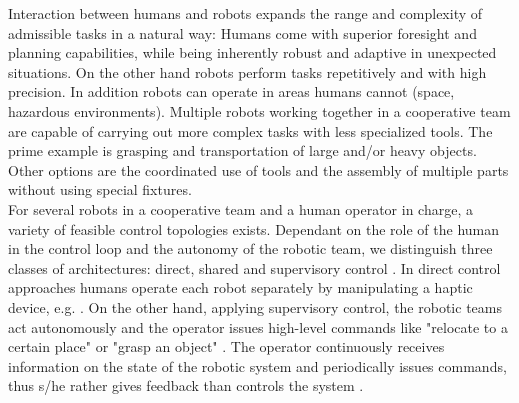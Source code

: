 \documentclass[a4paper,twoside, openright,12pt]{report}
\begin{document}
%
Interaction between humans and robots expands the range and complexity of admissible tasks in a natural way: Humans come with superior foresight and planning capabilities, while being inherently robust and adaptive in unexpected situations. On the other hand robots perform tasks repetitively and with high precision. In addition robots can operate in areas humans cannot (space, hazardous environments). Multiple robots working together in a cooperative team are capable of carrying out more complex tasks with less specialized tools. The prime example is grasping and transportation of large and/or heavy objects. Other options are the coordinated use of tools and the assembly of multiple parts without using special fixtures.\\
For several robots in a cooperative team and a human operator in charge, a variety of feasible control topologies exists. Dependant on the role of the human in the control loop and the autonomy of the robotic team, we distinguish three classes of architectures: direct, shared and supervisory control \cite{Hirche_12}. In direct control approaches humans operate each robot separately by manipulating a haptic device, e.g. \cite{Goertz_52}. On the other hand, applying supervisory control, the robotic teams act autonomously and the operator issues high-level commands like "relocate to a certain place" or "grasp an object" \cite{Peters_15}. The operator continuously receives information on the state of the robotic system and periodically issues commands, thus s/he rather gives feedback than controls the system \cite{Sheridian_92}.
\end{document}

